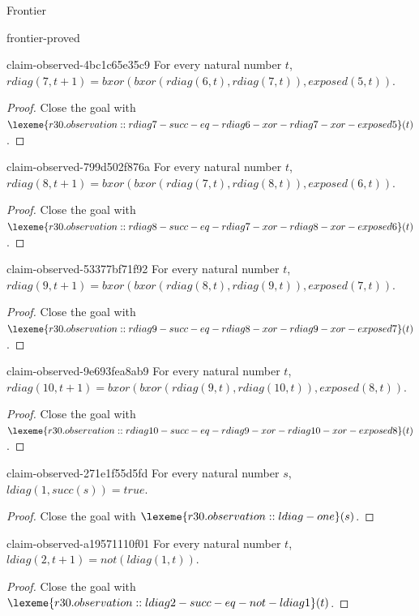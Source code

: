 \begin{lexlean}{Frontier}
\begin{section}{frontier-proved}
\begin{theorem}{claim-observed-4bc1c65e35c9}
For every natural number \(t\), \(rdiag(7, t + 1) = bxor(bxor(rdiag(6, t), rdiag(7, t)), exposed(5, t))\).
\begin{proof}
Close the goal with \(\lexeme{r30.observation::rdiag7-succ-eq-rdiag6-xor-rdiag7-xor-exposed5}(t)\).
\end{proof}
\end{theorem}

\begin{theorem}{claim-observed-799d502f876a}
For every natural number \(t\), \(rdiag(8, t + 1) = bxor(bxor(rdiag(7, t), rdiag(8, t)), exposed(6, t))\).
\begin{proof}
Close the goal with \(\lexeme{r30.observation::rdiag8-succ-eq-rdiag7-xor-rdiag8-xor-exposed6}(t)\).
\end{proof}
\end{theorem}

\begin{theorem}{claim-observed-53377bf71f92}
For every natural number \(t\), \(rdiag(9, t + 1) = bxor(bxor(rdiag(8, t), rdiag(9, t)), exposed(7, t))\).
\begin{proof}
Close the goal with \(\lexeme{r30.observation::rdiag9-succ-eq-rdiag8-xor-rdiag9-xor-exposed7}(t)\).
\end{proof}
\end{theorem}

\begin{theorem}{claim-observed-9e693fea8ab9}
For every natural number \(t\), \(rdiag(10, t + 1) = bxor(bxor(rdiag(9, t), rdiag(10, t)), exposed(8, t))\).
\begin{proof}
Close the goal with \(\lexeme{r30.observation::rdiag10-succ-eq-rdiag9-xor-rdiag10-xor-exposed8}(t)\).
\end{proof}
\end{theorem}

\begin{theorem}{claim-observed-271e1f55d5fd}
For every natural number \(s\), \(ldiag(1, succ(s)) = true\).
\begin{proof}
Close the goal with \(\lexeme{r30.observation::ldiag-one}(s)\).
\end{proof}
\end{theorem}

\begin{theorem}{claim-observed-a19571110f01}
For every natural number \(t\), \(ldiag(2, t + 1) = not(ldiag(1, t))\).
\begin{proof}
Close the goal with \(\lexeme{r30.observation::ldiag2-succ-eq-not-ldiag1}(t)\).
\end{proof}
\end{theorem}


\end{section}
\end{lexlean}

